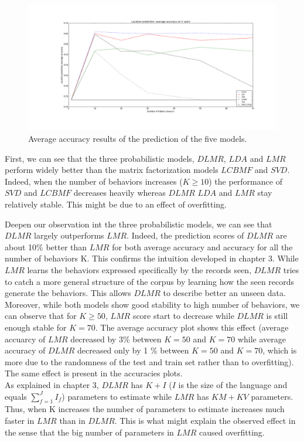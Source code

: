 \begin{figure} [!ht]
\centering
\includegraphics[scale=0.3]{Figures/location_average_accuracy.png}
\caption{Average accuracy results of the prediction of the five models.}
\label{avacc}
\end{figure}

First, we can see that the three probabilistic models, $DLMR$, $LDA$ and $LMR$ perform widely better than the matrix factorization models $LCBMF$ and $SVD$.
\\Indeed, when the number of behaviors increases ($K\geqslant 10$) the performance of $SVD$ and $LCBMF$ decreases heavily whereas $DLMR$ $LDA$ and $LMR$ stay relatively stable. This might be due to an effect of overfitting. \par

Deepen our observation int the three probabilistic models, we can see that $DLMR$ largely outperforms $LMR$. Indeed, the prediction scores of $DLMR$ are about 10\% better than $LMR$ for both average accuracy and accuracy for all the number of behaviors K. This confirms the intuition developed in chapter 3. While $LMR$ learns the behaviors expressed specifically by the records seen, $DLMR$ tries to catch a more general structure of the corpus by learning how the seen records generate the behaviors. This allows $DLMR$ to describe better an unseen data. Moreover, while both models show good stability to high number of behaviors, we can observe that for $K\geqslant 50$, $LMR$ score start to decrease while $DLMR$ is still enough stable for  $K=70$. The average accuracy plot shows this effect (average accuarcy of $LMR$ decreased by 3\% between $K = 50$ and $K = 70$ while average accuracy of $DLMR$ decreased only by 1 \% between $K = 50$ and $K = 70$, which is more due to the randomness of the test and train set rather than to overfitting). The same effect is present in the accuracies plots. 
\\As explained in chapter 3, $DLMR$ has $K+I$ ($I$ is the size of the language and equals $\sum_{f=1}^{J} I_f$) parameters to estimate while $LMR$ has $KM + KV$ parameters. Thus, when K increases the number of parameters to estimate increases much faster in $LMR$ than in $DLMR$. This is what might explain the observed effect in the sense that the big number of parameters in $LMR$ caused overfitting. \par

